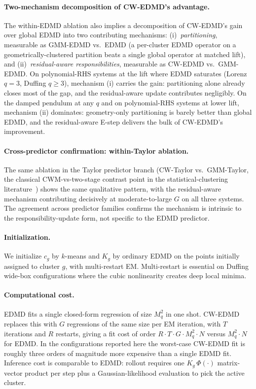 \documentclass{article}
\begin{document}
\paragraph{Two-mechanism decomposition of CW-EDMD's advantage.} The within-EDMD ablation also implies a decomposition of CW-EDMD's gain over global EDMD into two contributing mechanisms: (i)~\emph{partitioning}, measurable as GMM-EDMD vs.\ EDMD (a per-cluster EDMD operator on a geometrically-clustered partition beats a single global operator at matched lift), and (ii)~\emph{residual-aware responsibilities}, measurable as CW-EDMD vs.\ GMM-EDMD. On polynomial-RHS systems at the lift where EDMD saturates (Lorenz $q{=}3$, Duffing $q{\geq}3$), mechanism (i) carries the gain: partitioning alone already closes most of the gap, and the residual-aware update contributes negligibly. On the damped pendulum at any $q$ and on polynomial-RHS systems at lower lift, mechanism (ii) dominates: geometry-only partitioning is barely better than global EDMD, and the residual-aware E-step delivers the bulk of CW-EDMD's improvement.

\paragraph{Cross-predictor confirmation: within-Taylor ablation.} The same ablation in the Taylor predictor branch (CW-Taylor vs.\ GMM-Taylor, the classical CWM-vs-two-stage contrast point in the statistical-clustering literature~\citep{ingrassia2014linear}) shows the same qualitative pattern, with the residual-aware mechanism contributing decisively at moderate-to-large $G$ on all three systems. The agreement across predictor families confirms the mechanism is intrinsic to the responsibility-update form, not specific to the EDMD predictor.

\paragraph{Initialization.} We initialize $c_g$ by $k$-means and $K_g$ by ordinary EDMD on the points initially assigned to cluster $g$, with multi-restart EM. Multi-restart is essential on Duffing wide-box configurations where the cubic nonlinearity creates deep local minima.

\paragraph{Computational cost.} EDMD fits a single closed-form regression of size $M_q^2$ in one shot. CW-EDMD replaces this with $G$ regressions of the same size per EM iteration, with $T$ iterations and $R$ restarts, giving a fit cost of order $R \cdot T \cdot G \cdot M_q^2 \cdot N$ versus $M_q^2 \cdot N$ for EDMD. In the configurations reported here the worst-case CW-EDMD fit is roughly three orders of magnitude more expensive than a single EDMD fit. Inference cost is comparable to EDMD: rollout requires one $K_g\,\Phi(\cdot)$ matrix-vector product per step plus a Gaussian-likelihood evaluation to pick the active cluster.
\end{document}

